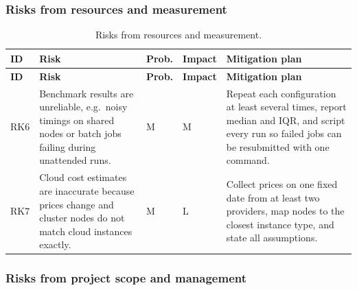 \subsubsection*{Risks from resources and measurement}
 
\begingroup
\small
\renewcommand{\arraystretch}{1.25}
\begin{longtable}{
  >{\raggedright\arraybackslash}p{}
  >{\raggedright\arraybackslash}p{}
  >{\centering\arraybackslash}p{}
  >{\centering\arraybackslash}p{}
  >{\raggedright\arraybackslash}p{}}
\caption{Risks from resources and measurement.}\label{tab:risk-res}\\
\toprule
\textbf{ID} & \textbf{Risk} & \textbf{Prob.} & \textbf{Impact} & \textbf{Mitigation plan}\\
\midrule
\endfirsthead
\toprule
\textbf{ID} & \textbf{Risk} & \textbf{Prob.} & \textbf{Impact} & \textbf{Mitigation plan}\\
\midrule
\endhead
\bottomrule
\endfoot

RK6 &
Benchmark results are unreliable, e.g.\ noisy timings on shared nodes or batch jobs failing during unattended runs. &
M & M &
Repeat each configuration at least several times, report median and IQR, and script every run so failed jobs can be resubmitted with one command.
\\ \midrule

RK7 &
Cloud cost estimates are inaccurate because prices change and cluster nodes do not match cloud instances exactly. &
M & L &
Collect prices on one fixed date from at least two providers, map nodes to the closest instance type, and state all assumptions.

\end{longtable}
\endgroup


\subsubsection*{Risks from project scope and management}
 
